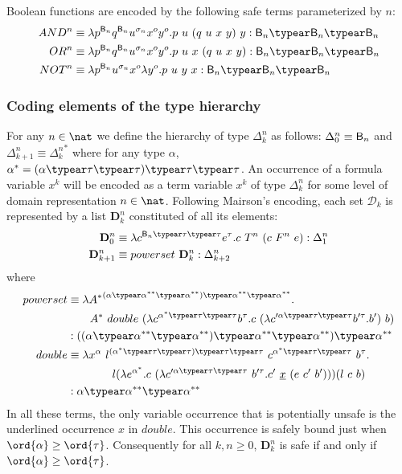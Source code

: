 Boolean functions are encoded by the following safe terms parameterized by $n$:
\begin{align*}
AND^n &\equiv \lambda p^{\booltype_n} q^{\booltype_n} u^{\sigma_n} x^o y^o . p~u~(q~u~x~y)~y : \booltype_n\typear\booltype_n\typear\booltype_n \\
OR^n &\equiv \lambda p^{\booltype_n} q^{\booltype_n} u^{\sigma_n} x^o y^o . p~u~x~(q~u~x~y) : \booltype_n\typear\booltype_{n}\typear\booltype_n \\
NOT^n &\equiv \lambda p^{\booltype_n} u^{\sigma_n} x^o \lambda y^o . p~u~y~x : \booltype_n\typear\booltype_n\typear\booltype_n
\end{align*}

\subsubsection{Coding elements of the type hierarchy}
For any $n\in\nat$ we define the hierarchy of type $\Delta_k^n$ as
follows: $\Delta_0^n \equiv \mathsf{B}_n$ and $\Delta_{k+1}^n \equiv
{\Delta_k^n}^*$ where for any type $\alpha$, $\alpha^* = (\alpha
\typear \tau \typear \tau)\typear \tau \typear \tau$. An occurrence
of a formula variable $x^k$ will be encoded as a term variable $x^k$
of type $\Delta_{k}^n$ for some level of domain representation
$n\in\nat$. Following Mairson's  encoding, each set $\mathcal{D}_k$
is represented by a list $\mathbf{D}_k^n$ constituted of all its
elements:
\begin{align*}
\mathbf{D}_0^n &\equiv \lambda c^{\booltype_n \typear \tau \typear \tau} e^\tau . c~T^n~(c~F^n~e) : \Delta_1^n \\
\mathbf{D}_{k+1}^n &\equiv powerset~\mathbf{D}_k^n : \Delta_{k+2}^n
\end{align*}
where
\begin{align*}
  powerset &\equiv \lambda {A^*}^{(\alpha \typear \alpha^{**} \typear \alpha^{**}) \typear \alpha^{**} \typear \alpha^{**}}. \\
&\qquad  A^*~double~(\lambda c^{\alpha^* \typear \tau\typear \tau} b^\tau . c~(\lambda c'^{\alpha\typear \tau\typear \tau} b'^\tau.b')~b)\\
 &: ((\alpha \typear \alpha^{**} \typear \alpha^{**}) \typear \alpha^{**} \typear \alpha^{**})\typear \alpha^{**} \\
  double &\equiv \lambda x^\alpha~l^{(\alpha^* \typear \tau\typear \tau)\typear \tau\typear \tau}~ c^{\alpha^*\typear \tau\typear \tau}~b^\tau. \\
  & \qquad \qquad l(\lambda e^{\alpha^*}.c~(\lambda c'^{\alpha\typear \tau\typear \tau}~ b'^\tau.c'~\underline{x}~(e~c'~b')))(l~c~b)\\
 &: \alpha \typear \alpha^{**} \typear \alpha^{**}
\end{align*}
In all these terms, the only variable occurrence that is potentially
unsafe is the underlined occurrence $x$ in $double$. This occurrence
is safely bound just when $\ord{\alpha} \geq \ord{\tau}$.
Consequently for all $k,n\geq0$, $\mathbf{D}_k^n$ is safe if and
only if $\ord{\alpha} \geq \ord{\tau}$.


